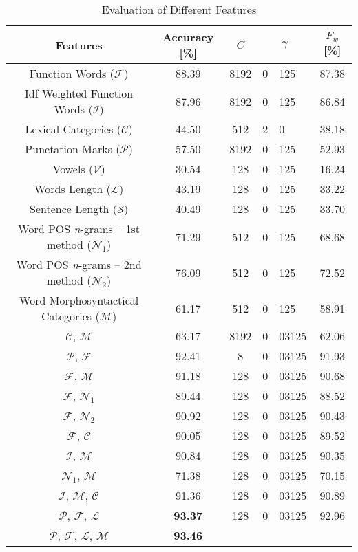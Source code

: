 \documentclass{llncs}
\begin{document}
\begin{table*}[htb]
\begin{center}
\caption{Evaluation of Different Features}%
\begin{tabular}{c c c r@{.}l c}%
\toprule%
Features & Accuracy [\%] & $C$ & \multicolumn{2}{c}{$\gamma$} & $F_w$ [\%]\\
\midrule
Function Words ($\mathcal{F}$) & 88.39 & 8192 & 0 & 125 & 87.38\\
Idf Weighted Function Words ($\mathcal{I}$) & 87.96 & 8192 & 0 & 125 & 86.84\\
Lexical Categories ($\mathcal{C}$) & 44.50 & 512 & 2 & 0 & 38.18\\
Punctation Marks ($\mathcal{P}$) & 57.50 & 8192 & 0 & 125 & 52.93\\
Vowels ($\mathcal{V}$) & 30.54 & 128 & 0 & 125 & 16.24\\
Words Length ($\mathcal{L}$) & 43.19 & 128 & 0 & 125 & 33.22\\
Sentence Length ($\mathcal{S}$) & 40.49 & 128 & 0 & 125 & 33.70\\
Word POS \emph{n}-grams -- 1st method ($\mathcal{N}_1$) & 71.29 &
512 & 0 & 125 & 68.68\\
Word POS \emph{n}-grams -- 2nd method ($\mathcal{N}_2$) & 76.09
& 512 & 0 & 125 & 72.52\\
Word Morphosyntactical Categories ($\mathcal{M}$) & 61.17 & 512 & 0 & 125 & 58.91\\
$\mathcal{C}$, $\mathcal{M}$ & 63.17 & 8192 & 0 & 03125 & 62.06\\
$\mathcal{P}$, $\mathcal{F}$ & 92.41 & 8 & 0 & 03125 & 91.93\\
$\mathcal{F}$, $\mathcal{M}$ & 91.18 & 128 & 0 & 03125 & 90.68\\
$\mathcal{F}$, $\mathcal{N}_1$ & 89.44 & 128 & 0 & 03125 & 88.52\\
$\mathcal{F}$, $\mathcal{N}_2$ & 90.92 & 128 & 0 & 03125 & 90.43\\
$\mathcal{F}$, $\mathcal{C}$ & 90.05 & 128 & 0 & 03125 & 89.52\\
$\mathcal{I}$, $\mathcal{M}$ & 90.84 & 128 & 0 & 03125 & 90.35\\
$\mathcal{N}_1$, $\mathcal{M}$ & 71.38 & 128 & 0 & 03125 & 70.15\\
$\mathcal{I}$, $\mathcal{M}$, $\mathcal{C}$ & 91.36 & 128 & 0 & 03125 & 90.89\\
$\mathcal{P}$, $\mathcal{F}$, $\mathcal{L}$ & \textbf{93.37} & 128 & 0 & 03125
& 92.96\\
$\mathcal{P}$, $\mathcal{F}$, $\mathcal{L}$, $\mathcal{M}$ & \textbf{93.46} &

\end{tabular}
\end{center}
\end{table*}
\end{document}
